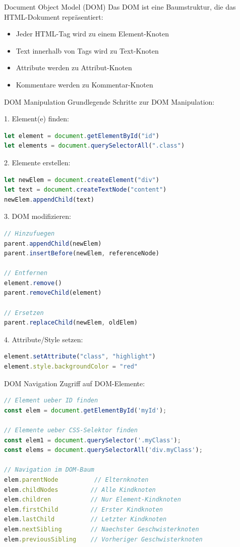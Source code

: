 \begin{concept}{Document Object Model (DOM)}
    Das DOM ist eine Baumstruktur, die das HTML-Dokument repräsentiert:
    \begin{itemize}
        \item Jeder HTML-Tag wird zu einem Element-Knoten
        \item Text innerhalb von Tags wird zu Text-Knoten
        \item Attribute werden zu Attribut-Knoten
        \item Kommentare werden zu Kommentar-Knoten
    \end{itemize}
\end{concept}

\begin{KR}{DOM Manipulation}
Grundlegende Schritte zur DOM Manipulation:

1. Element(e) finden:
\begin{lstlisting}[language=JavaScript, style=basesmol]
let element = document.getElementById("id")
let elements = document.querySelectorAll(".class")
\end{lstlisting}

2. Elemente erstellen:
\begin{lstlisting}[language=JavaScript, style=basesmol]
let newElem = document.createElement("div")
let text = document.createTextNode("content")
newElem.appendChild(text)
\end{lstlisting}

3. DOM modifizieren:
\begin{lstlisting}[language=JavaScript, style=basesmol]
// Hinzufuegen
parent.appendChild(newElem)
parent.insertBefore(newElem, referenceNode)

// Entfernen
element.remove()
parent.removeChild(element)

// Ersetzen
parent.replaceChild(newElem, oldElem)
\end{lstlisting}

4. Attribute/Style setzen:
\begin{lstlisting}[language=JavaScript, style=basesmol]
element.setAttribute("class", "highlight")
element.style.backgroundColor = "red"
\end{lstlisting}
\end{KR}

\begin{KR}{DOM Navigation}
Zugriff auf DOM-Elemente:
\begin{lstlisting}[language=JavaScript, style=basesmol]
// Element ueber ID finden
const elem = document.getElementById('myId');

// Elemente ueber CSS-Selektor finden
const elem1 = document.querySelector('.myClass');
const elems = document.querySelectorAll('div.myClass');

// Navigation im DOM-Baum
elem.parentNode          // Elternknoten
elem.childNodes         // Alle Kindknoten
elem.children           // Nur Element-Kindknoten
elem.firstChild         // Erster Kindknoten
elem.lastChild          // Letzter Kindknoten
elem.nextSibling        // Naechster Geschwisterknoten
elem.previousSibling    // Vorheriger Geschwisterknoten
\end{lstlisting}
\end{KR}


